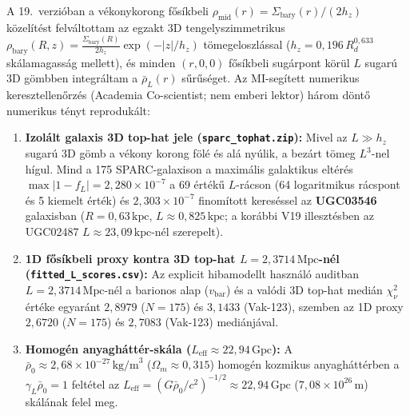 \documentclass[10pt,a4paper]{article}
\begin{document}
\par
A 19.\ verzi\'oban a v\'ekonykorong f\H{o}s\'ikbeli $\rho_{\text{mid}}(r) = \Sigma_{\text{bary}}(r)/(2h_z)$ k\"ozel\'it\'est felv\'altottam az egzakt 3D tengelyszimmetrikus $\rho_{\text{bary}}(R,z) = \frac{\Sigma_{\text{bary}}(R)}{2h_z}\exp(-|z|/h_z)$ t\"omegeloszl\'assal ($h_z = 0{,}196\,R_d^{0{,}633}$ sk\'alamagass\'ag mellett), \'es minden $(r,0,0)$ f\H{o}s\'ikbeli sug\'arpont k\"or\"ul $L$ sugar\'u 3D g\"ombben integr\'altam a $\bar{\rho}_L(r)$ s\H{u}r\H{u}s\'eget. Az MI-seg\'itett numerikus keresztellen\H{o}rz\'es (Academia Co-scientist; nem emberi lektor) h\'arom d\"ont\H{o} numerikus t\'enyt reproduk\'alt:
\begin{enumerate}\setlength{\itemsep}{1pt}\setlength{\parskip}{0pt}\setlength{\topsep}{1pt}
  \item \textbf{Izol\'alt galaxis 3D top-hat jele (\texttt{sparc\_tophat.zip}):} Mivel az $L \gg h_z$ sugar\'u 3D g\"omb a v\'ekony korong f\"ol\'e \'es al\'a ny\'ulik, a bez\'art t\"omeg $L^3$-nel h\'igul. Mind a 175 SPARC-galaxison a maxim\'alis galaktikus elt\'er\'es $\max |1 - f_L| = 2{,}280\times 10^{-7}$ a 69 \'ert\'ek\H{u} $L$-r\'acson (64 logaritmikus r\'acspont \'es 5 kiemelt \'ert\'ek) \'es \textbf{$2{,}303\times 10^{-7}$} finom\'itott keres\'essel az \textbf{UGC03546} galaxisban ($R = 0{,}63\,\text{kpc}$, $L \approx 0{,}825\,\text{kpc}$; a kor\'abbi V19 illeszt\'esben az UGC02487 $L \approx 23{,}09\,\text{kpc}$-n\'el szerepelt).
  \item \textbf{1D f\H{o}s\'ikbeli proxy kontra 3D top-hat $L = 2{,}3714\,\text{Mpc}$-n\'el (\texttt{fitted\_L\_scores.csv}):} Az explicit hibamodellt haszn\'al\'o auditban $L = 2{,}3714\,\text{Mpc}$-n\'el a barionos alap ($v_{\text{bar}}$) \'es a val\'odi 3D top-hat medi\'an $\chi^2_\nu$ \'ert\'eke egyar\'ant \textbf{$2{,}8979$} ($N=175$) \'es \textbf{$3{,}1433$} (Vak-123), szemben az 1D proxy $2{,}6720$ ($N=175$) \'es $2{,}7083$ (Vak-123) medi\'anj\'aval.
  \item \textbf{Homog\'en anyagh\'att\'er-sk\'ala ($L_{\text{eff}} \approx 22{,}94\,\text{Gpc}$):} A $\bar{\rho}_0 \approx 2{,}68\times 10^{-27}\,\text{kg/m}^3$ ($\Omega_m \approx 0{,}315$) homog\'en kozmikus anyagh\'att\'erben a $\gamma_L\bar{\rho}_0 = 1$ felt\'etel az $L_{\text{eff}} = (G\bar{\rho}_0/c^2)^{-1/2} \approx 22{,}94\,\text{Gpc}$ ($7{,}08\times 10^{26}\,\text{m}$) sk\'al\'anak felel meg.
\end{enumerate}
\end{document}
